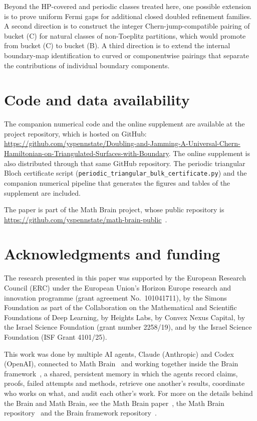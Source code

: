 \documentclass[11pt]{article}
\numberwithin{equation}{section}
\theoremstyle{definition}
\theoremstyle{remark}
\begin{document}
Beyond the HP-covered and periodic classes treated here, one possible extension is to prove
uniform Fermi gaps for additional closed doubled refinement families. A second direction is to
construct the integer Chern-jump-compatible pairing of bucket (C) for natural classes of
non-Toeplitz partitions, which would promote  from bucket (C) to
bucket (B). A third direction is to extend the internal boundary-map identification to curved
or componentwise pairings that separate the contributions of individual boundary components.

\section*{Code and data availability}\label{sec:code_availability}
The companion numerical code and the online supplement are available at the project repository,
which is hosted on GitHub:
\url{https://github.com/yspennstate/Doubling-and-Jamming-A-Universal-Chern-Hamiltonian-on-Triangulated-Surfaces-with-Boundary}.
The online supplement is also distributed through that same GitHub repository. The
periodic triangular Bloch certificate script
(\texttt{periodic\_triangular\_bulk\_certificate.py}) and the companion numerical pipeline
that generates the figures and tables of the supplement are included.

The paper is part of the Math Brain project, whose public repository is \url{https://github.com/yspennstate/math-brain-public}~\cite{MathBrainRepo}.

\section*{Acknowledgments and funding}
The research presented in this paper was supported by the European Research Council (ERC) under the European Union's Horizon Europe research and innovation programme (grant agreement No.~101041711), by the Simons Foundation as part of the Collaboration on the Mathematical and Scientific Foundations of Deep Learning, by Heights Labs, by Convex Nexus Capital, by the Israel Science Foundation (grant number 2258/19), and by the Israel Science Foundation (ISF Grant 4101/25).

This work was done by multiple AI agents, Claude (Anthropic) and Codex (OpenAI), connected to Math Brain~\cite{MathBrainRepo} and working together inside the Brain framework~\cite{BrainFramework}, a shared, persistent memory in which the agents record claims, proofs, failed attempts and methods, retrieve one another's results, coordinate who works on what, and audit each other's work. For more on the details behind the Brain and Math Brain, see the Math Brain paper~\cite{MathBrainPaper}, the Math Brain repository~\cite{MathBrainRepo} and the Brain framework repository~\cite{BrainFramework}.
\end{document}

